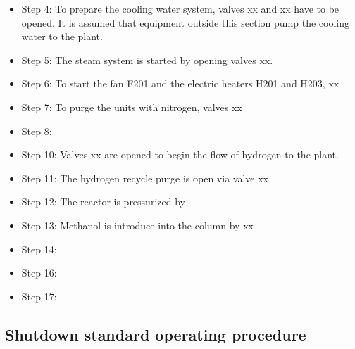 \begin{itemize}
    \item Step 4: To prepare the cooling water system, valves xx and xx have to be opened. It is assumed that equipment outside this section pump the cooling water to the plant.
    \item Step 5: The steam system is started by opening valves xx.
    \item Step 6: To start the fan F201 and the electric heaters H201 and H203, xx
    \item Step 7: To purge the units with nitrogen, valves xx
    \item Step 8: 
    \item Step 10: Valves xx are opened to begin the flow of hydrogen to the plant.
    \item Step 11: The hydrogen recycle purge is open via valve xx
    \item Step 12: The reactor is pressurized by
    \item Step 13: Methanol is introduce into the column by xx
    \item Step 14:
    \item Step 16:
    \item Step 17:
\end{itemize}


\subsection{Shutdown standard operating procedure}